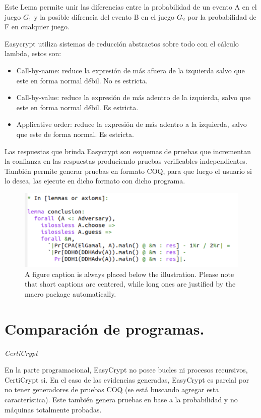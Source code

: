 \documentclass[runningheads,a4paper]{llncs}
\begin{document}
Este Lema permite unir las diferencias entre la probabilidad de un evento A en el juego $G_1$ y la posible difrencia del evento B en el juego $G_2$ por la probabilidad de F en cualquier juego.\cite{article4}


Easycrypt utiliza sistemas de reducción abstractos sobre todo con el cálculo lambda, estos son:

\begin{itemize}

	\item Call-by-name: reduce la expresión de más afuera de la izquierda salvo que este en forma normal débil. No es estricta.

	\item Call-by-value: reduce la expresión de más adentro de la izquierda, salvo que este en forma normal débil. Es estricta.

	\item Applicative order: reduce la expresión de más adentro a la izquierda, salvo que este de forma normal. Es estricta.
\end{itemize}

Las respuestas que brinda Easycrypt son esquemas de pruebas que incrementan la confianza en las respuestas produciendo pruebas verificables independientes. También permite generar pruebas en formato COQ, para que luego el usuario si lo desea, las ejecute en dicho formato con dicho programa.\cite{article4}

\begin{figure}
\includegraphics[width=\textwidth]{fig1.png}
\caption{A figure caption is always placed below the illustration.
Please note that short captions are centered, while long ones are
justified by the macro package automatically.} \label{fig1}
\end{figure}


\section{Comparación de programas.}
\centerline{\emph{CertiCrypt}}
En la parte programacional, EasyCrypt no posee bucles ni procesos recursivos, CertiCrypt si. En el caso de las evidencias generadas, EasyCrypt es parcial por no tener generadores de pruebas COQ (se está buscando agregar esta característica). Este también genera pruebas en base a la probabilidad y no máquinas totalmente probadas.
\end{document}

